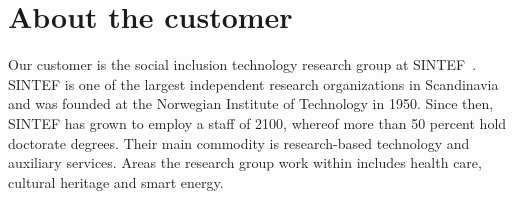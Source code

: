 \section{About the customer}

Our customer is the social inclusion technology research group at SINTEF~\cite{sintef}. SINTEF is one of the largest independent research organizations in Scandinavia and was founded at the Norwegian Institute of Technology in 1950. Since then, SINTEF has grown to employ a staff of 2100, whereof more than 50 percent hold doctorate degrees. Their main commodity is research-based technology and auxiliary services. Areas the research group work within includes health care, cultural heritage and smart energy.

